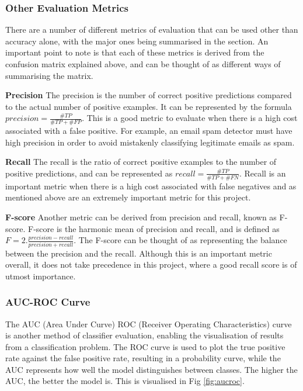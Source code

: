 \documentclass[12pt]{report}
\begin{document}
\subsubsection*{Other Evaluation Metrics}
\begin{flushleft}
There are a number of different metrics of evaluation that can be used other than accuracy alone, with the major ones being summarised in the section. An important point to note is that each of these metrics is derived from the confusion matrix explained above, and can be thought of as different ways of summarising the matrix.

\vspace{0.5cm}
\textbf{Precision}
\linebreak
The precision is the number of correct positive predictions compared to the actual number of positive examples. It can be represented by the formula $precision = \frac{\#TP}{\#TP + \#FP}$. This is a good metric to evaluate when there is a high cost associated with a false positive. For example, an email spam detector must have high precision in order to avoid mistakenly classifying legitimate emails as spam. 

\vspace{0.5cm}
\textbf{Recall}
\linebreak
The recall is the ratio of correct positive examples to the number of positive predictions, and can be represented as $recall = \frac{\#TP}{\#TP + \#FN}$. Recall is an important metric when there is a high cost associated with false negatives and as mentioned above are an extremely important metric for this project.

\vspace{0.5cm}
\textbf{F-score}
\linebreak
Another metric can be derived from precision and recall, known as F-score. F-score is the harmonic mean of precision and recall, and is defined as 
$F = 2. \frac{precision - recall}{precision + recall}$. The F-score can be thought of as representing the balance between the precision and the recall. Although this is an important metric overall, it does not take precedence in this project, where a good recall score is of utmost importance.
\end{flushleft}

\subsubsection*{AUC-ROC Curve}
\begin{flushleft}
The AUC (Area Under Curve) ROC (Receiver Operating Characteristics) curve is another method of classifier evaluation, enabling the visualisation of results from a classification problem. The ROC curve is used to plot the true positive rate against the false positive rate, resulting in a probability curve, while the AUC represents how well the model distinguishes between classes. The higher the AUC, the better the model is. This is visualised in Fig \ref{fig:aucroc}.
\end{flushleft}
\end{document}
